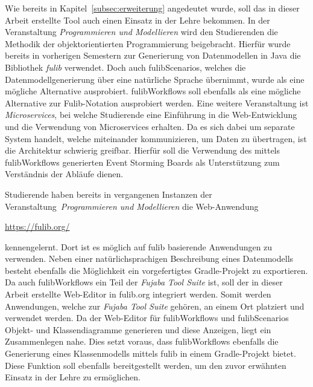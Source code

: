Wie bereits in Kapitel~\ref{subsec:erweiterung} angedeutet wurde, soll das in dieser Arbeit erstellte Tool auch einen Einsatz in der Lehre bekommen.
In der Veranstaltung \textit{Programmieren und Modellieren} wird den Studierenden die Methodik der objektorientierten Programmierung beigebracht.
Hierfür wurde bereits in vorherigen Semestern zur Generierung von Datenmodellen in Java die Bibliothek \textit{fulib} verwendet.
Doch auch fulibScenarios, welches die Datenmodellgenerierung über eine natürliche Sprache übernimmt, wurde als eine mögliche Alternative ausprobiert.
fulibWorkflows soll ebenfalls als eine mögliche Alternative zur Fulib-Notation ausprobiert werden.
Eine weitere Veranstaltung ist \textit{Microservices}, bei welche Studierende eine Einführung in die Web-Entwicklung und die Verwendung von
Microservices erhalten.
Da es sich dabei um separate System handelt, welche miteinander kommunizieren, um Daten zu übertragen, ist die Architektur schwierig greifbar.
Hierfür soll die Verwendung des mittels fulibWorkflows generierten Event Storming Boards als Unterstützung zum Verständnis der Abläufe dienen.

Studierende haben bereits in vergangenen Instanzen der Veranstaltung~\textit{Programmieren und Modellieren} die Web-Anwendung

\-\hspace{5cm}\url{https://fulib.org/}

kennengelernt.
Dort ist es möglich auf fulib basierende Anwendungen zu verwenden.
Neben einer natürlichsprachigen Beschreibung eines Datenmodells besteht ebenfalls die Möglichkeit ein vorgefertigtes Gradle-Projekt zu exportieren.
Da auch fulibWorkflows ein Teil der \textit{Fujaba Tool Suite} ist, soll der in dieser Arbeit erstellte Web-Editor in fulib.org integriert werden.
Somit werden Anwendungen, welche zur \textit{Fujaba Tool Suite} gehören, an einem Ort platziert und verwendet werden.
Da der Web-Editor für fulibWorkflows und fulibScenarios Objekt- und Klassendiagramme generieren und diese Anzeigen, liegt ein Zusammenlegen nahe.
Dies setzt voraus, dass fulibWorkflows ebenfalls die Generierung eines Klassenmodells mittels fulib in einem Gradle-Projekt bietet.
Diese Funktion soll ebenfalls bereitgestellt werden, um den zuvor erwähnten Einsatz in der Lehre zu ermöglichen.
